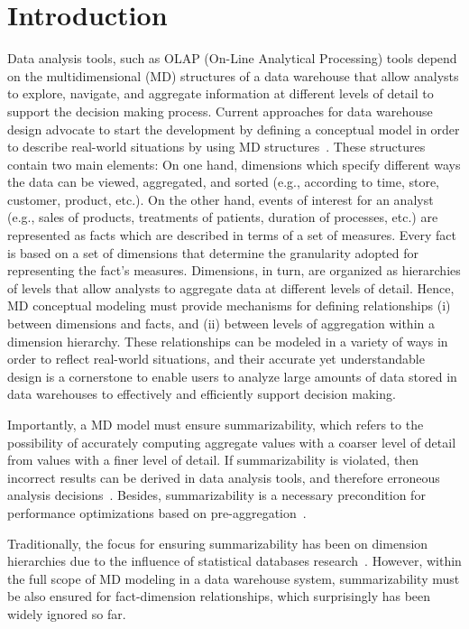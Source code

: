 \section{Introduction}
\label{a3:sec:intro} Data analysis tools, such as OLAP (On-Line
Analytical Processing) tools depend on the multidimensional (MD)
structures of a data warehouse that allow analysts to explore,
navigate, and aggregate information at different levels of detail to
support the decision making process. Current approaches for data
warehouse design advocate to start the development by defining a
conceptual model in order to describe real-world situations by using
MD structures~\cite{DBLP:conf/dolap/RizziALT06}. These structures
contain two main elements: On one hand, dimensions which specify
different ways the data can be viewed, aggregated, and sorted (e.g.,
according to time, store, customer, product, etc.). On the other
hand, events of interest for an analyst (e.g., sales of products,
treatments of patients, duration of processes, etc.) are represented
as facts which are described in terms of a set of measures. Every
fact is based on a set of dimensions that determine the granularity
adopted for representing the fact's measures. Dimensions, in turn,
are organized as hierarchies of levels that allow analysts to
aggregate data at different levels of detail. Hence, MD conceptual
modeling must provide mechanisms for defining relationships (i)
between dimensions and facts, and (ii) between levels of aggregation
within a dimension hierarchy. These relationships can be modeled in
a variety of ways in order to reflect real-world situations, and
their accurate yet understandable design is a cornerstone to enable
users to analyze large amounts of data stored in data warehouses to
effectively and efficiently support decision making.

Importantly, a MD model must ensure summarizability, which refers to
the possibility of accurately computing aggregate values with a
coarser level of detail from values with a finer level of detail. If
summarizability is violated, then incorrect results can be derived
in data analysis tools, and therefore erroneous analysis
decisions~\cite{DBLP:conf/ssdbm/LehnerAW98,DBLP:conf/ssdbm/LenzS97}.
Besides, summarizability is a necessary precondition for performance
optimizations based on
pre-aggregation~\cite{DBLP:conf/vldb/PedersenJD99}.

Traditionally, the focus for ensuring summarizability has been on
dimension hierarchies due to the influence of statistical databases
research~\cite{DBLP:conf/ssdbm/LenzS97}. However, within the full
scope of MD modeling in a data warehouse system, summarizability
must be also ensured for fact-dimension relationships, which
surprisingly has been widely ignored so far.

